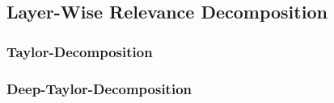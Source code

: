 \subsection{Layer-Wise Relevance Decomposition}
\blindtext[3]

\subsubsection{Taylor-Decomposition}
\blindtext[1]

\subsubsection{Deep-Taylor-Decomposition}
\blindtext[1]